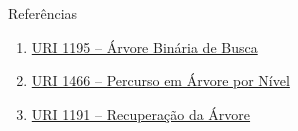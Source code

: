 \begin{frame}[fragile]{Referências}

    \begin{enumerate}
        \item \href{https://www.urionlinejudge.com.br/judge/pt/problems/view/1195}{URI 1195 -- Árvore Binária de Busca}

        \item \href{https://www.urionlinejudge.com.br/repository/UOJ_1466.html}{URI 1466 -- Percurso em Árvore por Nível}

        \item \href{https://www.urionlinejudge.com.br/judge/pt/problems/view/1191}{URI 1191 -- Recuperação da Árvore}

    \end{enumerate}

\end{frame}
